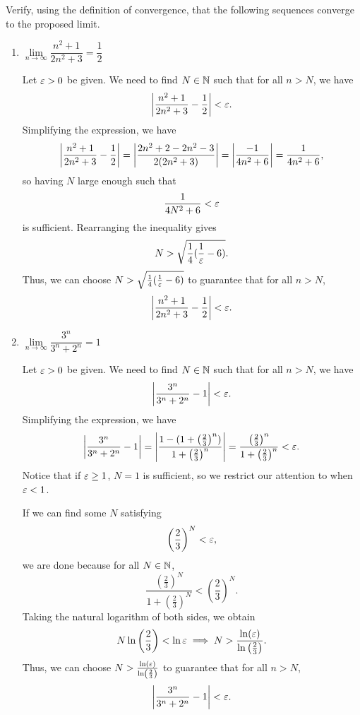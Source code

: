 \begin{problem}
  Verify, using the definition of convergence, that the following sequences converge to the proposed limit.

  \begin{enumerate}[label=(\alph*)]
    \item $\lim\limits_{n \to \infty} \dfrac{n^{2} + 1}{2n^{2} + 3} = \dfrac{1}{2}$

      Let $\varepsilon > 0$ be given. We need to find $N \in \mathbb{N}$ such that for all $n > N$, we have 
      \[
        \left\lvert \frac{n^{2} + 1}{2n^{2} + 3} - \frac{1}{2} \right\rvert < \varepsilon.
      \]
      Simplifying the expression, we have
      \[
        \left\lvert \frac{n^{2} + 1}{2n^{2} + 3} - \frac{1}{2} \right\rvert = \left\lvert \frac{2n^{2} + 2 - 2n^{2} - 3}{2(2n^{2} + 3)} \right\rvert = \left\lvert \frac{-1}{4n^{2} + 6} \right\rvert = \frac{1}{4n^{2} + 6},
      \]
      so having $N$ large enough such that
      \[
        \frac{1}{4N^{2} + 6} < \varepsilon
      \]
      is sufficient. Rearranging the inequality gives 
      \[
        N > \sqrt{\frac{1}{4}(\frac{1}{\varepsilon} - 6)}.
      \]
      Thus, we can choose $N > \sqrt{\frac{1}{4}(\frac{1}{\varepsilon} - 6)}$ to 
      guarantee that for all $n > N$,
      \[
        \left\lvert \frac{n^{2} + 1}{2n^{2} + 3} - \frac{1}{2} \right\rvert < \varepsilon.
      \]

    \item $\lim\limits_{n \to \infty} \dfrac{3^{n}}{3^{n} + 2^{n}} = 1$

      Let $\varepsilon > 0$ be given. We need to find $N \in \mathbb{N}$ such that for all $n > N$, we have 
      \[
        \left\lvert \frac{3^{n}}{3^{n} + 2^{n}} - 1 \right\rvert < \varepsilon.
      \]
      Simplifying the expression, we have
      \[
        \left\lvert \frac{3^{n}}{3^{n} + 2^{n}} - 1 \right\rvert = \left\lvert \frac{1 - (1 + \left( \frac{2}{3} \right)^{n})}{1 + \left( \frac{2}{3} \right)^{n}} \right\rvert = \frac{\left( \frac{2}{3} \right)^{n}}{1 + \left( \frac{2}{3} \right)^{n}} < \varepsilon.
      \]
      Notice that if $\varepsilon \geq 1$, $N = 1$ is sufficient, so we restrict our attention to when $\varepsilon < 1$.
      
      If we can find some $N$ satisfying
      \[
        \left(\frac{2}{3}\right)^{N} < \varepsilon,
      \]
      we are done because for all $N \in \mathbb{N}$,
      \[
        \frac{\left( \frac{2}{3} \right)^{N}}{1 + \left( \frac{2}{3} \right)^{N}} < \left(\frac{2}{3}\right)^{N}.
      \]
      Taking the natural logarithm of both sides, we obtain
      \[ 
        N \ln{ \left( \frac{2}{3} \right) } < \ln{\varepsilon} \implies N > \frac{\ln (\varepsilon)}{\ln \left( \frac{2}{3} \right)}.
      \]
      Thus, we can choose $N > \frac{\ln (\varepsilon)}{\ln \left( \frac{2}{3} \right)}$ to guarantee that for all $n > N$,
      \[
        \left\lvert \frac{3^{n}}{3^{n} + 2^{n}} - 1 \right\rvert < \varepsilon.
      \]


\end{enumerate}
\end{problem}
